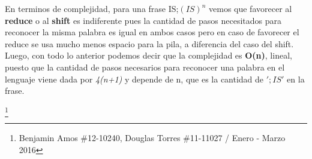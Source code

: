 \documentclass[a4paper, 10pt]{article}
\newcommand\blfootnote[1]{%
  \begingroup
  \renewcommand\thefootnote{}\footnote{#1}%
  \addtocounter{footnote}{-1}%
  \endgroup
}
\begin{document}
\begin{enumerate}[leftmargin=*]
\begin{enumerate}[label=(\alph*)]
			En terminos de complejidad, para una frase IS;$(IS)^n$ vemos que favorecer al \textbf{reduce} o al \textbf{shift} es indiferente pues la cantidad de pasos necesitados para reconocer la misma palabra es igual en ambos casos pero en caso de favorecer el reduce se usa mucho menos espacio para la pila, a diferencia del caso del shift. Luego, con todo lo anterior podemos decir que la complejidad es \textbf{O(n)}, lineal, puesto que la cantidad de pasos necesarios para reconocer una palabra en el lenguaje viene dada por \textit{4(n+1)} y depende de n, que es la cantidad de $';IS'$ en la frase. 

			\end{enumerate}
		\end{enumerate}
	\blfootnote{Benjamin Amos \#12-10240, Douglas Torres \#11-11027 / Enero - Marzo 2016}				 		
	
			
\end{document}
